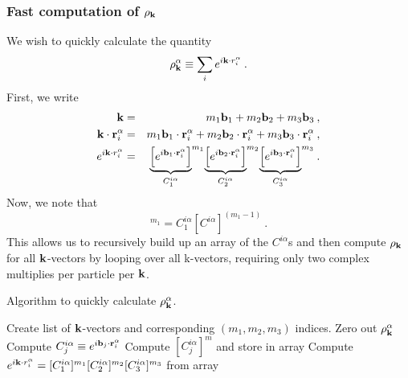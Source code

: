 \subsubsection{Fast computation of $\rho_{\mathbf{k}}$}
We wish to quickly calculate the quantity
\begin{equation}
\rho_{\mathbf{k}}^\alpha \equiv \sum_i e^{i\mathbf{k} \cdot r_i^\alpha}\:.
\end{equation}
First, we write 
\begin{eqnarray}
\mathbf{k} & = & m_1 \mathbf{b}_1 + m_2 \mathbf{b}_2 + m_3 \mathbf{b}_3\:, \\
\mathbf{k} \cdot \mathbf{r}_i^\alpha & = &  m_1 \mathbf{b}_1 \cdot \mathbf{r}_i^\alpha + 
m_2 \mathbf{b}_2 \cdot \mathbf{r}_i^\alpha + m_3 \mathbf{b}_3 \cdot \mathbf{r}_i^\alpha\:, \\
e^{i\mathbf{k} \cdot r_i^\alpha} & = & 
{\underbrace{\left[e^{i \mathbf{b}_1 \cdot\mathbf{r}_i^\alpha}\right]}_{C^{i\alpha}_1}}^{m_1}
{\underbrace{\left[e^{i \mathbf{b}_2 \cdot\mathbf{r}_i^\alpha}\right]}_{C^{i\alpha}_2}}^{m_2}
{\underbrace{\left[e^{i \mathbf{b}_3 \cdot\mathbf{r}_i^\alpha}\right]}_{C^{i\alpha}_3}}^{m_3}\:.
\end{eqnarray}
Now, we note that
\begin{equation}
[C^{i\alpha}_1]^{m_1} = C^{i\alpha}_1 [C^{i\alpha}]^{(m_1-1)}\:.
\end{equation}
This allows us to recursively build up an array of the $C^{i\alpha}$s
and then compute $\rho_{\mathbf{k}}$ for all $\mathbf{k}$-vectors by looping over all
k-vectors, requiring only two complex multiplies per particle per
$\mathbf{k}$.
\begin{algorithm}
\caption{Algorithm to quickly calculate $\rho_{\mathbf{k}}^\alpha$.}
\begin{algorithmic}
\STATE Create list of $\mathbf{k}$-vectors and corresponding $(m_1, m_2,
m_3)$ indices.
  \STATE Zero out $\rho_{\mathbf{k}}^\alpha$
      \STATE Compute $C^{i \alpha}_j \equiv e^{i \mathbf{b}_j \cdot
        \mathbf{r}^{\alpha}_i}$
         \STATE Compute $[C^{i \alpha}_j]^m$ and store in array
       \ENDFOR
    \ENDFOR
       \STATE Compute $e^{i \mathbf{k} \cdot r^\alpha_i} =
         [C^{i\alpha}_1]^{m_1} [C^{i\alpha}_2]^{m_2}
         [C^{i\alpha}_3]^{m_3}$ from array
    \ENDFOR
  \ENDFOR
\ENDFOR
\end{algorithmic}
\end{algorithm}

